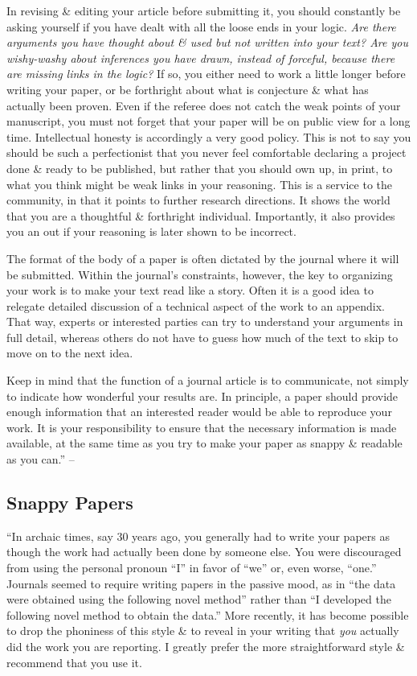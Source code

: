 \documentclass{article}
\numberwithin{equation}{section}
\begin{document}
In revising \& editing your article before submitting it, you should constantly be asking yourself if you have dealt with all the loose ends in your logic. \textit{Are there arguments you have thought about \& used but not written into your text? Are you wishy-washy about inferences you have drawn, instead of forceful, because there are missing links in the logic?} If so, you either need to work a little longer before writing your paper, or be forthright about what is conjecture \& what has actually been proven. Even if the referee does not catch the weak points of your manuscript, you must not forget that your paper will be on public view for a long time. Intellectual honesty is accordingly a very good policy. This is not to say you should be such a perfectionist that you never feel comfortable declaring a project done \& ready to be published, but rather that you should own up, in print, to what you think might be weak links in your reasoning. This is a service to the community, in that it points to further research directions. It shows the world that you are a thoughtful \& forthright individual. Importantly, it also provides you an out if your reasoning is later shown to be incorrect.

The format of the body of a paper is often dictated by the journal where it will be submitted. Within the journal's constraints, however, the key to organizing your work is to make your text read like a story. Often it is a good idea to relegate detailed discussion of a technical aspect of the work to an appendix. That way, experts or interested parties can try to understand your arguments in full detail, whereas others do not have to guess how much of the text to skip to move on to the next idea.

Keep in mind that the function of a journal article is to communicate, not simply to indicate how wonderful your results are. In principle, a paper should provide enough information that an interested reader would be able to reproduce your work. It is your responsibility to ensure that the necessary information is made available, at the same time as you try to make your paper as snappy \& readable as you can.'' -- \cite[pp. 54--64]{Feibelman2011}

\subsection{Snappy Papers}
``In archaic times, say 30 years ago, you generally had to write your papers as though the work had actually been done by someone else. You were discouraged from using the personal pronoun ``I'' in favor of ``we'' or, even worse, ``one.'' Journals seemed to require writing papers in the passive mood, as in ``the data were obtained using the following novel method'' rather than ``I developed the following novel method to obtain the data.'' More recently, it has become possible to drop the phoniness of this style \& to reveal in your writing that \textit{you} actually did the work you are reporting. I greatly prefer the more straightforward style \& recommend that you use it.
\end{document}
